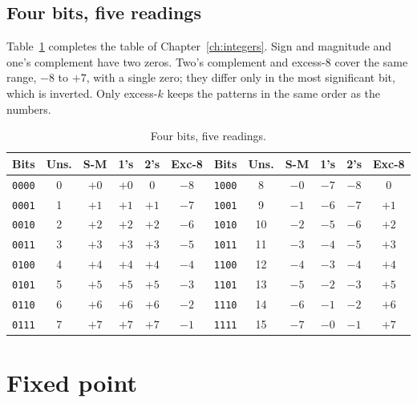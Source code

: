 \subsection{Four bits, five readings}

Table~\ref{tab:real:five} completes the table of Chapter~\ref{ch:integers}.
Sign and magnitude and one's complement have two zeros. Two's complement and
excess-8 cover the same range, $-8$ to $+7$, with a single zero; they differ
only in the most significant bit, which is inverted. Only excess-$k$ keeps
the patterns in the same order as the numbers.

\begin{table}[htb]
\centering\small
\caption{Four bits, five readings.}\label{tab:real:five}
\setlength{\tabcolsep}{4.5pt}
\begin{tabular}{@{}cccccc@{\qquad}cccccc@{}}
\toprule
\textbf{Bits} & \textbf{Uns.} & \textbf{S-M} & \textbf{1's} & \textbf{2's} & \textbf{Exc-8} &
\textbf{Bits} & \textbf{Uns.} & \textbf{S-M} & \textbf{1's} & \textbf{2's} & \textbf{Exc-8}\\
\midrule
\texttt{0000} & 0 & $+0$ & $+0$ & 0 & $-8$ & \texttt{1000} & 8 & $-0$ & $-7$ & $-8$ & 0\\
\texttt{0001} & 1 & $+1$ & $+1$ & $+1$ & $-7$ & \texttt{1001} & 9 & $-1$ & $-6$ & $-7$ & $+1$\\
\texttt{0010} & 2 & $+2$ & $+2$ & $+2$ & $-6$ & \texttt{1010} & 10 & $-2$ & $-5$ & $-6$ & $+2$\\
\texttt{0011} & 3 & $+3$ & $+3$ & $+3$ & $-5$ & \texttt{1011} & 11 & $-3$ & $-4$ & $-5$ & $+3$\\
\texttt{0100} & 4 & $+4$ & $+4$ & $+4$ & $-4$ & \texttt{1100} & 12 & $-4$ & $-3$ & $-4$ & $+4$\\
\texttt{0101} & 5 & $+5$ & $+5$ & $+5$ & $-3$ & \texttt{1101} & 13 & $-5$ & $-2$ & $-3$ & $+5$\\
\texttt{0110} & 6 & $+6$ & $+6$ & $+6$ & $-2$ & \texttt{1110} & 14 & $-6$ & $-1$ & $-2$ & $+6$\\
\texttt{0111} & 7 & $+7$ & $+7$ & $+7$ & $-1$ & \texttt{1111} & 15 & $-7$ & $-0$ & $-1$ & $+7$\\
\bottomrule
\end{tabular}
\end{table}

\section{Fixed point}

